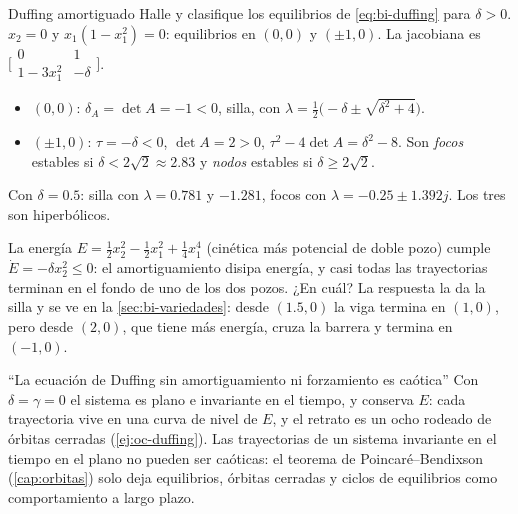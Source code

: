 \begin{ejemplo}[label=ej:bi-duffing]{Duffing amortiguado}
Halle y clasifique los equilibrios de \eqref{eq:bi-duffing} para $\delta>0$.
\solucion $x_2=0$ y $x_1(1-x_1^2)=0$: equilibrios en $(0,0)$ y $(\pm1,0)$. La jacobiana es $\bigl[\begin{smallmatrix}0&1\\1-3x_1^2&-\delta\end{smallmatrix}\bigr]$.
\begin{itemize}
  \item $(0,0)$: $\delta_A=\det A=-1<0$, silla, con $\lambda=\tfrac12\bigl(-\delta\pm\sqrt{\delta^2+4}\bigr)$.
  \item $(\pm1,0)$: $\tau=-\delta<0$, $\det A=2>0$, $\tau^2-4\det A=\delta^2-8$. Son \emph{focos} estables si $\delta<2\sqrt2\approx2.83$ y \emph{nodos} estables si $\delta\ge2\sqrt2$.
\end{itemize}
Con $\delta=0.5$: silla con $\lambda=0.781$ y $-1.281$, focos con $\lambda=-0.25\pm1.392j$. Los tres son hiperbólicos.
\end{ejemplo}

La energía $E=\tfrac12x_2^2-\tfrac12x_1^2+\tfrac14x_1^4$ (cinética más potencial de doble pozo) cumple $\dot E=-\delta x_2^2\le0$: el amortiguamiento disipa energía, y casi todas las trayectorias terminan en el fondo de uno de los dos pozos. ¿En cuál? La respuesta la da la silla y se ve en la \cref{sec:bi-variedades}: desde $(1.5,0)$ la viga termina en $(1,0)$, pero desde $(2,0)$, que tiene más energía, cruza la barrera y termina en $(-1,0)$.


\begin{trampa}[label=tr:bi-caos]{``La ecuación de Duffing sin amortiguamiento ni forzamiento es caótica''}
Con $\delta=\gamma=0$ el sistema es plano e invariante en el tiempo, y conserva $E$: cada trayectoria vive en una curva de nivel de $E$, y el retrato es un ocho rodeado de órbitas cerradas (\cref{ej:oc-duffing}). Las trayectorias de un sistema invariante en el tiempo en el plano no pueden ser caóticas: el teorema de Poincaré--Bendixson (\cref{cap:orbitas}) solo deja equilibrios, órbitas cerradas y ciclos de equilibrios como comportamiento a largo plazo.
\end{trampa}


